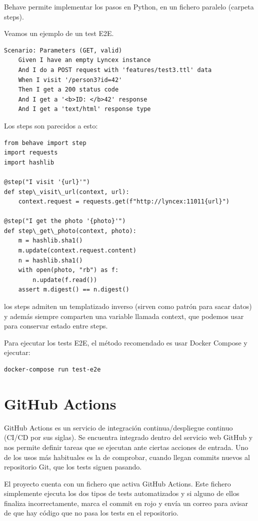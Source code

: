 \documentclass[12pt]{report} %
\begin{document}
Behave permite implementar los pasos en Python, en un fichero paralelo (carpeta steps).

Veamos un ejemplo de un test E2E.

\begin{lstlisting}
Scenario: Parameters (GET, valid)
    Given I have an empty Lyncex instance
    And I do a POST request with 'features/test3.ttl' data
    When I visit '/person3?id=42'
    Then I get a 200 status code
    And I get a '<b>ID: </b>42' response
    And I get a 'text/html' response type
\end{lstlisting}

Los steps son parecidos a esto:
\begin{lstlisting}
from behave import step
import requests
import hashlib

@step("I visit '{url}'")
def step\_visit\_url(context, url):
    context.request = requests.get(f"http://lyncex:11011{url}")

@step("I get the photo '{photo}'")
def step\_get\_photo(context, photo):
    m = hashlib.sha1()
    m.update(context.request.content)
    n = hashlib.sha1()
    with open(photo, "rb") as f:
        n.update(f.read())
    assert m.digest() == n.digest()
\end{lstlisting}

los steps admiten un templatizado inverso (sirven como patrón para sacar datos) y además siempre comparten una variable llamada context, que podemos usar para conservar estado entre steps.

Para ejecutar los tests E2E, el método recomendado es usar Docker Compose y ejecutar:

\begin{verbatim}
docker-compose run test-e2e
\end{verbatim}

\section{GitHub Actions}

GitHub Actions es un servicio de integración continua/despliegue continuo (CI/CD por sus siglas). Se encuentra integrado dentro del servicio web GitHub y nos permite definir tareas que se ejecutan ante ciertas acciones de entrada. Uno de los usos más habituales es la de comprobar, cuando llegan commits nuevos al repositorio Git, que los tests siguen pasando.

El proyecto cuenta con un fichero que activa GitHub Actions. Este fichero simplemente ejecuta los dos tipos de tests automatizados y si alguno de ellos finaliza incorrectamente, marca el commit en rojo y envía un correo para avisar de que hay código que no pasa los tests en el repositorio.
\end{document}
